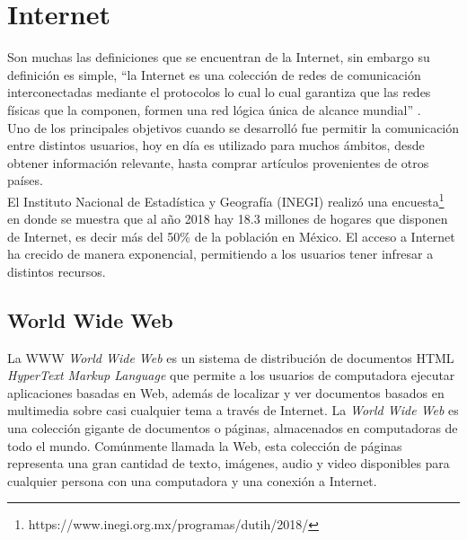 

\section{Internet}

Son muchas las definiciones que se encuentran de la Internet, sin embargo su definición es simple, 
``la Internet es una colección de redes de comunicación interconectadas mediante el protocolos 
lo cual lo cual garantiza que las redes físicas que la componen, formen una red lógica única de 
alcance mundial'' \citep{CTInternet}.
\\

Uno de los principales objetivos cuando se desarrolló fue permitir la comunicación entre distintos usuarios,
hoy en día es utilizado para muchos ámbitos, desde obtener información relevante, hasta comprar artículos 
provenientes de otros países.
\\

El Instituto Nacional de Estadística y Geografía (INEGI) realizó una encuesta\footnote{https://www.inegi.org.mx/programas/dutih/2018/}  
en donde se muestra que al año 2018 hay 18.3 millones de hogares que disponen de Internet, es decir más del 
50\% de la población en México.
El acceso a Internet ha crecido de manera exponencial, permitiendo a los usuarios tener infresar a distintos recursos.



\subsection{World Wide Web}

La WWW \textit{World Wide Web} es un sistema de distribución de documentos HTML \textit{HyperText Markup Language} 
que permite a los usuarios de computadora ejecutar aplicaciones basadas en Web, además de localizar y ver documentos 
basados en multimedia sobre casi cualquier tema a través de Internet.
La \textit{World Wide Web} es una colección gigante de documentos o páginas, almacenados en computadoras de todo el mundo. 
Comúnmente llamada la Web, esta colección de páginas representa una gran cantidad de texto, imágenes, audio y video disponibles 
para cualquier persona con una computadora y una conexión a Internet.

